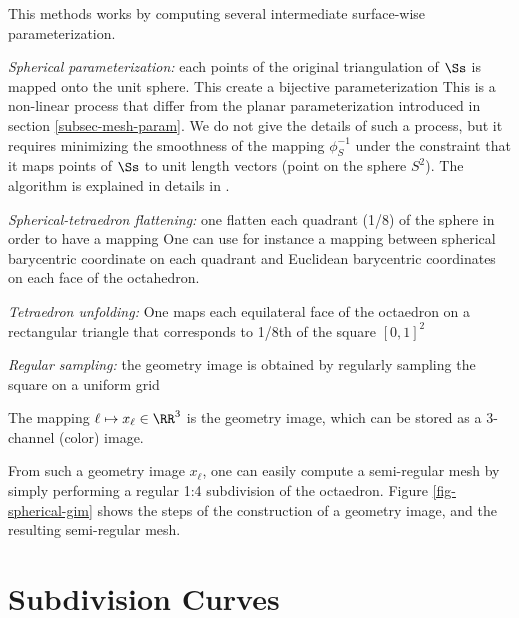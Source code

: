This methods works by computing several intermediate surface-wise parameterization.
\begin{rs}
	\item \textit{Spherical parameterization:} each points of the original triangulation of $\Ss$ is mapped onto the unit sphere.
		This create a bijective parameterization
		This is a non-linear process that differ from the planar parameterization introduced in section \ref{subsec-mesh-param}.
		We do not give the details of such a process, but it requires minimizing the smoothness of the mapping $\phi_S^{-1}$ under the constraint that it maps points of $\Ss$ to unit length vectors (point on the sphere $S^2$). The algorithm is explained in details in \cite{praun-spherical}.
	\item \textit{Spherical-tetraedron flattening:} one flatten each quadrant (1/8) of the sphere in order to have a mapping
			 One can use for instance a mapping between spherical barycentric coordinate on each quadrant and Euclidean barycentric coordinates on each face of the octahedron. 
	\item \textit{Tetraedron unfolding:} One maps each equilateral face of the octaedron on a rectangular triangle that corresponds to 1/8th of the square $[0,1]^2$
	\item \textit{Regular sampling:} the geometry image is obtained by regularly sampling the square on a uniform grid
\end{rs}
The mapping $\ell \mapsto x_\ell \in \RR^3$ is the geometry image, which can be stored as a 3-channel (color) image.

From such a geometry image $x_\ell$, one can easily compute a semi-regular mesh by simply performing a regular 1:4 subdivision of the octaedron. Figure \ref{fig-spherical-gim} shows the steps of the construction of a geometry image, and the resulting semi-regular mesh.


\section{Subdivision Curves}


